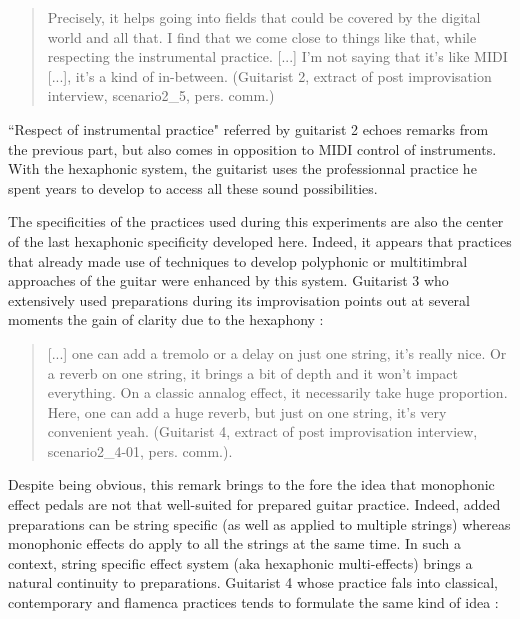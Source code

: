 \documentclass{article}
\begin{document}
\begin{quote}
Precisely, it helps going into fields that could be covered by the digital world and all that.  I find that we come close to things like that, while respecting the instrumental practice.  [...] I'm not saying that it's like MIDI [...], it's a kind of in-between.  (Guitarist 2, extract of post improvisation interview, scenario2\_5, pers. comm.)
\end{quote}

``Respect of instrumental practice" referred by guitarist 2 echoes remarks from the previous part, but also comes in opposition to MIDI control of instruments. With the hexaphonic system, the guitarist uses the professionnal practice he spent years to develop to access all these sound possibilities.

The specificities of the practices used during this experiments are also the center of the last hexaphonic specificity developed here. Indeed, it appears that practices that already made use of techniques to develop polyphonic or multitimbral approaches of the guitar were enhanced by this system. 
Guitarist 3 who extensively used preparations during its improvisation points out at several moments the gain of clarity due to the hexaphony : 

\begin{quote}
[...] one can add a tremolo or a delay on just one string, it's really nice. Or a reverb on one string, it brings a bit of depth and it won't impact everything. On a classic annalog effect, it necessarily take huge proportion. Here, one can add a huge reverb, but just on one string, it's very convenient yeah. (Guitarist 4, extract of post improvisation interview, scenario2\_4-01, pers. comm.).
\end{quote}

Despite being obvious, this remark brings to the fore the idea that monophonic effect pedals are not that well-suited for prepared guitar practice. Indeed, added preparations can be string specific (as well as applied to multiple strings) whereas monophonic effects do apply to all the strings at the same time.
In such a context, string specific effect system (aka hexaphonic multi-effects) brings a natural continuity to preparations.
Guitarist 4 whose practice fals into classical, contemporary and flamenca practices tends to formulate the same kind of idea : 
\end{document}
